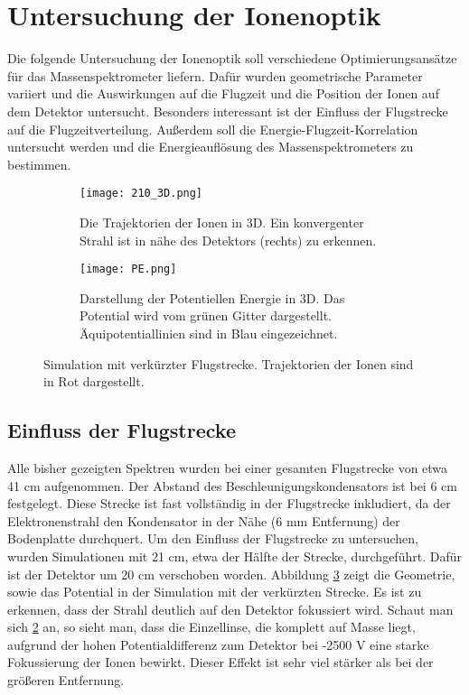 \section{Untersuchung der Ionenoptik}
Die folgende Untersuchung der Ionenoptik soll verschiedene Optimierungsansätze für das Massenspektrometer liefern. Dafür wurden geometrische Parameter variiert und die Auswirkungen auf die Flugzeit und die Position der Ionen auf dem Detektor untersucht. Besonders interessant ist der Einfluss der Flugstrecke auf die Flugzeitverteilung. Außerdem soll die Energie-Flugzeit-Korrelation untersucht werden und die Energieauflösung des Massenspektrometers zu bestimmen.

\begin{figure}
    \centering
    \begin{subfigure}{.48\textwidth}
        \centering
        \texttt{[image: 210\_3D.png]}
        \caption{Die Trajektorien der Ionen in 3D. Ein konvergenter Strahl ist in nähe des Detektors (rechts) zu erkennen.}
        \label{fig:210}
    \end{subfigure}%
    \hfill
    \begin{subfigure}{.48\textwidth}
        \centering
        \texttt{[image: PE.png]}
        \caption{Darstellung der Potentiellen Energie in 3D. Das Potential wird vom grünen Gitter dargestellt. Äquipotentiallinien sind in Blau eingezeichnet.}
        \label{fig:PE}
    \end{subfigure}
    \caption[Simulation mit verkürzter Flugstrecke]{Simulation mit verkürzter Flugstrecke. Trajektorien der Ionen sind in Rot dargestellt.}
    \label{fig:210_PE}
\end{figure}

\subsection{Einfluss der Flugstrecke}
Alle bisher gezeigten Spektren wurden bei einer gesamten Flugstrecke von etwa 41 cm aufgenommen. Der Abstand des Beschleunigungskondensators ist bei 6 cm festgelegt. Diese Strecke ist fast vollständig in der Flugstrecke inkludiert, da der Elektronenstrahl den Kondensator in der Nähe (6 mm Entfernung) der Bodenplatte durchquert. Um den Einfluss der Flugstrecke zu untersuchen, wurden Simulationen mit 21 cm, etwa der Hälfte der Strecke, durchgeführt. Dafür ist der Detektor um 20 cm verschoben worden. Abbildung \ref{fig:210_PE} zeigt die Geometrie, sowie das Potential in der Simulation mit der verkürzten Strecke. Es ist zu erkennen, dass der Strahl deutlich auf den Detektor fokussiert wird. Schaut man sich \ref{fig:PE} an, so sieht man, dass die Einzellinse, die komplett auf Masse liegt, aufgrund der hohen Potentialdifferenz zum Detektor bei -2500 V eine starke Fokussierung der Ionen bewirkt. Dieser Effekt ist sehr viel stärker als bei der größeren Entfernung. 

